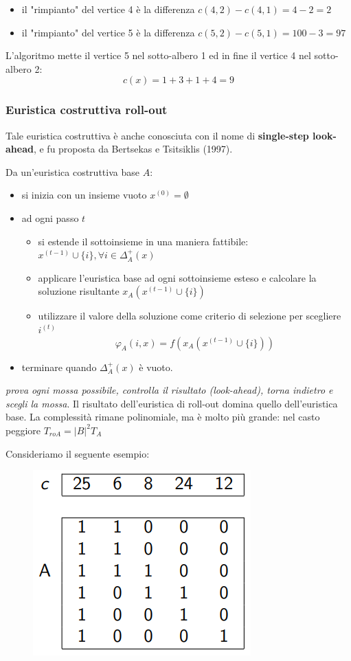 \documentclass{article}
\begin{document}
\begin{itemize}
    \item il "rimpianto" del vertice 4 è la differenza $c(4,2)-c(4,1)=4-2=2$
    \item il "rimpianto" del vertice 5 è la differenza $c(5,2)-c(5,1)=100-3=97$
\end{itemize}
L'algoritmo mette il vertice 5 nel sotto-albero 1 ed in fine il vertice 4 nel sotto-albero 2:
$$c(x)=1+3+1+4=9$$

\subsubsection{Euristica costruttiva roll-out}
Tale euristica costruttiva è anche conosciuta con il nome di \textbf{single-step look-ahead}, e
fu proposta da Bertsekas e Tsitsiklis (1997).

Da un'euristica costruttiva base $A$:
\begin{itemize}
    \item si inizia con un insieme vuoto $x^{(0)}=\emptyset$
    \item ad ogni passo $t$
          \begin{itemize}
              \item si estende il sottoinsieme in una maniera fattibile: $x^{(t-1)}\cup\{i\},\forall i\in\Delta_A^+(x)$
              \item applicare l'euristica base ad ogni sottoinsieme esteso e calcolare la soluzione risultante
                    $x_A(x^{(t-1)}\cup\{i\})$
              \item utilizzare il valore della soluzione come criterio di selezione per scegliere $i^{(t)}$
                    $$\varphi_A(i,x)=f(x_A(x^{(t-1)}\cup\{i\}))$$
          \end{itemize}
    \item terminare quando $\Delta_A^+(x)$ è vuoto.
\end{itemize}
\textit{prova ogni mossa possibile, controlla il risultato (look-ahead), torna indietro e scegli la mossa}.
Il risultato dell'euristica di roll-out domina quello dell'euristica base. La complessità
rimane polinomiale, ma è molto più grande: nel casto peggiore $T_{roA}=|B|^2 T_A$

Consideriamo il seguente esempio:
\begin{figure}[H]
    \centering
    \includegraphics[scale=0.7]{images/scp_ro.png}
\end{figure}
\end{document}
